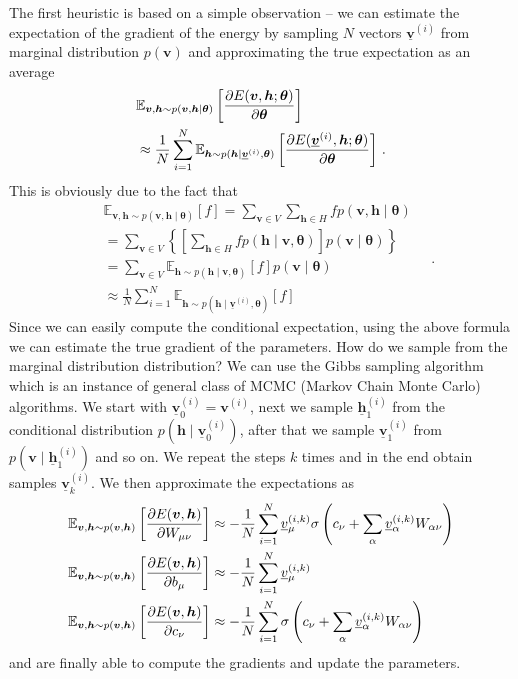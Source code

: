 \documentclass{myclass}
\begin{document}
The first heuristic is based on a simple observation -- we can estimate the expectation of the
gradient of the energy by sampling \(N\) vectors \(\underline{\bm{v}}^{(i)}\) from marginal
distribution \(p(\bm{v})\) and approximating the true expectation as an average
\[
\begin{split}
   &\mathbb{E}_{\bm{v}, \bm{h} \sim p(\bm{v},\bm{h} \mid \bm{\theta})}\left[\pdv{E(\bm{v},\bm{h}; \bm{\theta})}{\bm{\theta}}\right] \\
   &\approx \frac{1}{N} \sum_{i=1}^N \mathbb{E}_{\bm{h} \sim p(\bm{h} \mid \underline{\bm{v}}^{(i)}, \bm{\theta})}\left[\pdv{E(\underline{\bm{v}}^{(i)},\bm{h}; \bm{\theta})}{\bm{\theta}}\right]\,. 
\end{split}
\]
This is obviously due to the fact that
\[
\begin{split}
   &\mathbb{E}_{\bm{v}, \bm{h} \sim p(\bm{v},\bm{h} \mid \bm{\theta})}\left[ f \right] = \sum_{\bm{v} \in V} \sum_{\bm{h} \in H} f p(\bm{v}, \bm{h} \mid \bm{\theta}) \\
   &= \sum_{\bm{v} \in V} \left\{ \left[ \sum_{\bm{h} \in H} f p(\bm{h} \mid \bm{v}, \bm{\theta}) \right] p(\bm{v} \mid \bm{\theta}) \right\}\\
   &= \sum_{\bm{v} \in V} \mathbb{E}_{\bm{h} \sim p(\bm{h} \mid \bm{v}, \bm{\theta})}[f] p(\bm{v} \mid \bm{\theta})\\
   &\approx \frac{1}{N} \sum_{i=1}^N \mathbb{E}_{\bm{h} \sim p(\bm{h} \mid \underline{\bm{v}}^{(i)}, \bm{\theta})}[f]
\end{split}\quad.
\]
Since we can easily compute the conditional expectation, using the above formula we can estimate the
true gradient of the parameters. How do we sample from the marginal distribution distribution? We
can use the Gibbs sampling algorithm which is an instance of general class of MCMC (Markov Chain
Monte Carlo) algorithms. We start with \(\underline{\bm{v}}_0^{(i)} = \bm{v}^{(i)}\), next we sample
\(\underline{\bm{h}}_1^{(i)}\) from the conditional distribution \(p(\bm{h} \mid
\underline{\bm{v}}_0^{(i)})\), after that we sample \(\underline{\bm{v}}_1^{(i)}\) from \(p(\bm{v}
\mid \underline{\bm{h}}_1^{(i)})\) and so on. We repeat the steps \(k\) times and in the end obtain
samples \(\underline{\bm{v}}_k^{(i)}\). We then approximate the expectations as
\[
\begin{split}
&\mathbb{E}_{\bm{v},\bm{h} \sim p(\bm{v},\bm{h})}\left[ \pdv{E(\bm{v}, \bm{h})}{W_{\mu\nu}}\right] \approx - \frac{1}{N}\sum_{i=1}^N \underline{v}_\mu^{(i,k)} \sigma\left(c_\nu + \sum_\alpha \underline{v}_\alpha^{(i,k)} W_{\alpha\nu}\right)\\
&\mathbb{E}_{\bm{v},\bm{h} \sim p(\bm{v},\bm{h})}\left[ \pdv{E(\bm{v}, \bm{h})}{b_{\mu}}\right] \approx - \frac{1}{N}\sum_{i=1}^N \underline{v}_\mu^{(i,k)}\\
&\mathbb{E}_{\bm{v},\bm{h} \sim p(\bm{v},\bm{h})}\left[ \pdv{E(\bm{v}, \bm{h})}{c_\nu}\right] \approx - \frac{1}{N}\sum_{i=1}^N \sigma\left(c_\nu + \sum_\alpha \underline{v}_\alpha^{(i,k)} W_{\alpha\nu}\right)
\end{split}
\]
and are finally able to compute the gradients and update the parameters.
\end{document}
